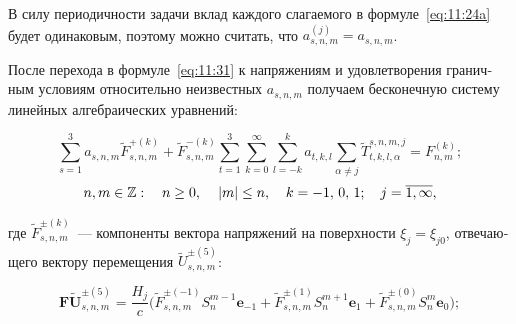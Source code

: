 \begin{russian}
В силу периодичности задачи вклад каждого слагаемого в формуле~\eqref{eq:11:24a} будет одинаковым, поэтому можно считать, что $a_{s,n,m}^{(j)}=a_{s,n,m}$.

После перехода в формуле~\eqref{eq:11:31} к напряжениям и удовлетворения граничным условиям относительно неизвестных $a_{s,n,m}$ получаем бесконечную систему линейных алгебраических уравнений:

\begin{equation}
\sum\limits_{s=1}^3 a_{s,n,m}\tilde F_{s,n,m}^{+(k)}+\tilde F_{s,n,m}^{-(k)}\sum\limits_{t=1}^3\sum\limits_{k=0}^\infty\sum\limits_{l=-k}^k a_{t,k,l}\sum\limits_{\alpha\neq j}\tilde T_{t,k,l,\alpha}^{s,n,m,j}=F_{n,m}^{(k)};
\label{eq:11:sys}
\end{equation}
$$
n,m \in\mathbb{Z}:\quad n \ge 0,{\mkern 1mu} \quad {\kern 1pt} |m| \le n,\quad {\mkern 1mu} k =  - 1,{\mkern 1mu} {\kern 1pt} 0,{\mkern 1mu} {\kern 1pt} 1;\;\;\;{\mkern 1mu} {\kern 1pt} j = \overline {1,\infty},
$$

\noindent где $\tilde F_{s,n,m}^{\pm(k)}$~--- компоненты вектора напряжений на поверхности $\xi_j=\xi_{j0}$, отвечающего вектору перемещения $\tilde U_{s,n,m}^{\pm(5)}$:

$$
\mathbf{F\tilde U}_{s,n,m}^{\pm(5)}=\frac{H_j}{c}\bigg(\tilde F_{s,n,m}^{\pm(-1)}S_n^{m-1}\mathbf{e}_{-1}+\tilde F_{s,n,m}^{\pm(1)}S_n^{m+1}\mathbf{e}_1+\tilde F_{s,n,m}^{\pm(0)}S_n^m\mathbf{e}_0\bigg);
$$


\end{russian}
